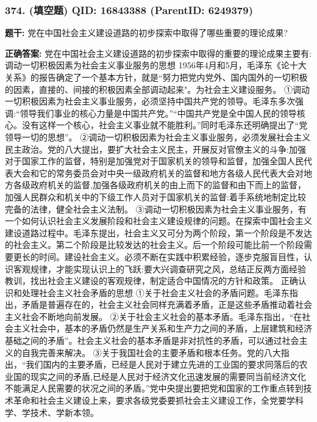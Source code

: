 \documentclass[12pt,UTF8]{ctexart}
\begin{document}
\vspace{0.3em}\hrulefill\vspace{0.7em}

\subsubsection*{374. (填空题) \small QID: 16843388 (ParentID: 6249379)}

\textbf{题干:}
党在中国社会主义建设道路的初步探索中取得了哪些重要的理论成果?



\textbf{正确答案:}
党在中国社会主义建设道路的初步探索中取得的重要的理论成果主要有:
调动一切积极因素为社会主义事业服务的思想
1956年4月和5月，毛泽东《论十大关系》的报告确定了一个基本方针，就是“努力把党内党外、国内国外的一切积极的因素，直接的、间接的积极因素全部调动起来"。为社会主义建设服务。
①调动一切积极因素为社会主义事业服务，必须坚持中国共产党的领导。毛泽东多次强调:“领导我们事业的核心力量是中国共产党。”“中国共产党是全中国人民的领导核心。没有这样一个核心，社会主义事业就不能胜利。”同时毛泽东还明确提出了“党领导一切的思想”。
②调动一切积极因素为社会主义事业服务，必须发展社会主义民主政治。党的八大提出，要扩大社会主义民主，开展反对官僚主义的斗争:加强对于国家工作的监督，特别是加强党对于国家机关的领导和监督，加强全国人民代表大会和它的常务委员会对中央一级政府机关的监督和地方各级人民代表大会对地方各级政府机关的监督,加强各级政府机关的由上而下的监督和由下而上的监督，加强人民群众和机关中的下级工作人员对于国家机关的监督:着手系统地制定比较完备的法律，健全社会主义法制。
③调动一切积极因素为社会主义事业服务，有一个如何认识社会主义发展阶段和社会主义建设规律的问题。在探索中国社会主义建设道路过程中。毛泽东提出，社会主义又可分为两个阶段，第一个阶段是不发达的社会主义。第二个阶段是比较发达的社会主义。后一个阶段可能比前一个阶段需要更长的时间。建设社会主义。必须不断在实践中积累经验，逐步克服盲目性，认识客观规律，才能实现认识上的飞跃:要大兴调查研究之风，总结正反两方面经验教训，找出社会主义建设的客观规律，制定适合中国情况的方针和政策。
正确认识和处理社会主义社会矛盾的思想
①关于社会主义社会的矛盾问题。毛泽东指出，矛盾是普遍存在的，社会主义社会同样充满着矛盾，正是这些矛盾推动着社会主义社会不断地向前发展。
②关于社会主义社会的基本矛盾。毛泽东指出，“在社会主义社会中，基本的矛盾仍然是生产关系和生产力之间的矛盾，上层建筑和经济基础之间的矛盾”。社会主义社会的基本矛盾是非对抗性的矛盾，可以通过社会主义的自我完善来解决。
③关于我国社会的主要矛盾和根本任务。党的八大指出，“我们国内的主要矛盾，已经是人民对于建立先进的工业国的要求同落后的农业国的现实之间的矛盾,已经是人民对于经济文化迅速发展的需要同当前经济文化不能满足人民需要的状况之间的矛盾。”党中央提出要把党和国家的工作重点转到技术革命和社会主义建设上来，要求各级党委要抓社会主义建设工作，全党要学科学、学技术、学新本领。
\end{document}
